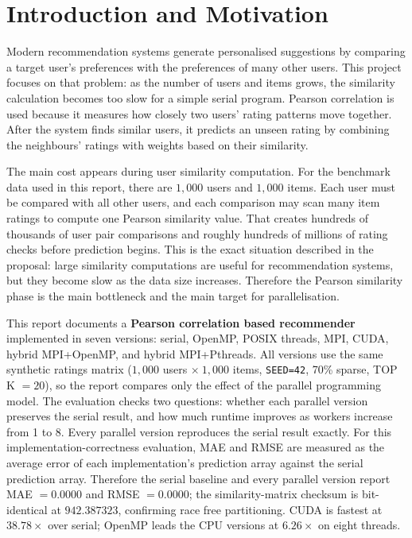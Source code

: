 \documentclass[11pt,a4paper]{article}
\newcommand{\code}[1]{\texttt{\small #1}}
\begin{document}
\section{Introduction and Motivation}\label{sec:intro}

Modern recommendation systems generate personalised suggestions by comparing a
target user's preferences with the preferences of many other users. This project
focuses on that problem: as the number of users and items grows, the similarity
calculation becomes too slow for a simple serial program. Pearson correlation is
used because it measures how closely two users' rating patterns move together.
After the system finds similar users, it predicts an unseen rating by combining
the neighbours' ratings with weights based on their similarity.

The main cost appears during user similarity computation. For the benchmark data
used in this report, there are $1{,}000$ users and $1{,}000$ items. Each user
must be compared with all other users, and each comparison may scan many item
ratings to compute one Pearson similarity value. That creates hundreds of
thousands of user pair comparisons and roughly hundreds of millions of rating
checks before prediction begins. This is the exact situation described in the
proposal: large similarity computations are useful for recommendation systems,
but they become slow as the data size increases. Therefore the Pearson
similarity phase is the main bottleneck and the main target for parallelisation.

This report documents a \textbf{Pearson correlation based recommender}
implemented in seven versions: serial, OpenMP, POSIX threads, MPI, CUDA, hybrid
MPI+OpenMP, and hybrid MPI+Pthreads. All versions use the same synthetic
ratings matrix ($1{,}000$ users $\times\ 1{,}000$ items, \code{SEED=42}, 70\%
sparse, TOP K $= 20$), so the report compares only the effect of the
parallel programming model. The evaluation checks two questions: whether each
parallel version preserves the serial result, and how much runtime improves
as workers increase from 1 to 8. Every parallel version reproduces the serial
result exactly. For this implementation-correctness evaluation, MAE and RMSE
are measured as the average error of each implementation's prediction array
against the serial prediction array. Therefore the serial baseline and every
parallel version report MAE $=0.0000$ and RMSE $=0.0000$; the similarity-matrix
checksum is bit-identical at
$942.387323$, confirming race free partitioning. CUDA is fastest at $38.78\times$ over serial; OpenMP
leads the CPU versions at $6.26\times$ on eight threads.
\end{document}
